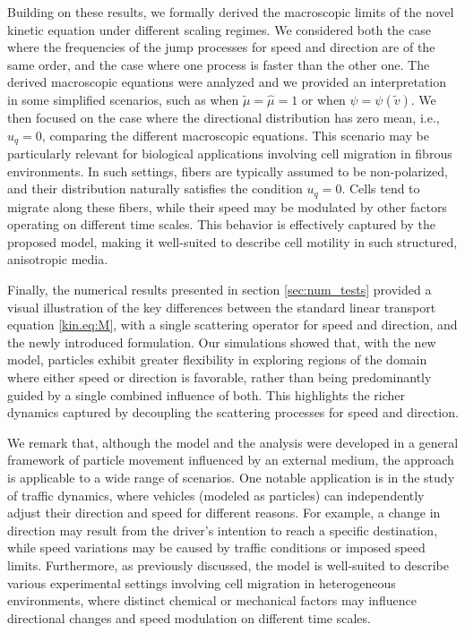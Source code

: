 \documentclass[a4paper]{article}
\theoremstyle{Theorem}\newtheorem{proposition}{Proposition}[section]
\theoremstyle{Remark}\newtheorem{remark}{Remark}[section]
\theoremstyle{Theorem}\newtheorem{theorem}{Theorem}[section]
\newcommand{\tv}{\tilde{v}}
\newcommand{\hmu}{\hat{\mu}}
\newcommand{\tmu}{\tilde{\mu}}
\begin{document}
Building on these results, we formally derived the macroscopic limits of the novel kinetic equation under different scaling regimes. We considered both the case where the frequencies of the jump processes for speed and direction are of the same order, and the case where one process is faster than the other one. The derived macroscopic equations were analyzed and we provided an interpretation in some simplified scenarios, such as when $\tmu=\hmu=1$ or when $\psi=\psi(\tv)$. We then focused on the case where the directional distribution has zero mean, i.e., $u_q=0$, comparing the different macroscopic equations. This scenario may be particularly relevant for biological applications involving cell migration in fibrous environments. In such settings, fibers are typically assumed to be non-polarized, and their distribution naturally satisfies the condition $u_q=0$. Cells tend to migrate along these fibers, while their speed may be modulated by other factors operating on different time scales. This behavior is effectively captured by the proposed model, making it well-suited to describe cell motility in such structured, anisotropic media.

Finally, the numerical results presented in section \ref{sec:num_tests} provided a visual illustration of the key differences between the standard linear transport equation \eqref{kin.eq:M}, with a single scattering operator for speed and direction, and the newly introduced formulation. Our simulations showed that, with the new model, particles exhibit greater flexibility in exploring regions of the domain where either speed or direction is favorable, rather than being predominantly guided by a single combined influence of both. This highlights the richer dynamics captured by decoupling the scattering processes for speed and direction.

We remark that, although the model and the analysis were developed in a general framework of particle movement influenced by an external medium, the approach is applicable to a wide range of scenarios. One notable application is in the study of traffic dynamics, where vehicles (modeled as particles) can independently adjust their direction and speed for different reasons. For example, a change in direction may result from the driver's intention to reach a specific destination, while speed variations may be caused by traffic conditions or imposed speed limits. Furthermore, as previously discussed, the model is well-suited to describe various experimental settings involving cell migration in heterogeneous environments, where distinct chemical or mechanical factors may influence directional changes and speed modulation on different time scales.
\end{document}
